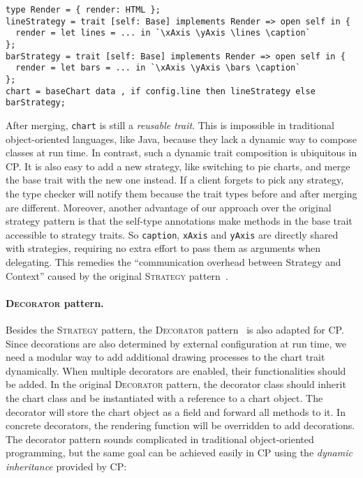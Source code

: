 \begin{lstlisting}
type Render = { render: HTML };
lineStrategy = trait [self: Base] implements Render => open self in {
  render = let lines = ... in `\xAxis \yAxis \lines \caption`
};
barStrategy = trait [self: Base] implements Render => open self in {
  render = let bars = ... in `\xAxis \yAxis \bars \caption`
};
chart = baseChart data , if config.line then lineStrategy else barStrategy;
\end{lstlisting}

\noindent
After merging, \lstinline{chart} is still a \emph{reusable trait}. This is
impossible in traditional object-oriented languages, like Java, because they
lack a dynamic way to compose classes at run time. In contrast, such a dynamic
trait composition is ubiquitous in CP. It is also easy to add a new strategy,
like switching to pie charts, and merge the base trait with the new one instead.
If a client forgets to pick any strategy, the type checker will notify them
because the trait types before and after merging are different. Moreover,
another advantage of our approach over the original strategy pattern is that the
self-type annotations make methods in the base trait accessible to strategy
traits. So \lstinline{caption}, \lstinline{xAxis} and \lstinline{yAxis} are
directly shared with strategies, requiring no extra effort to pass them as
arguments when delegating. This remedies the ``communication overhead between
Strategy and Context'' caused by the original \textsc{Strategy}
pattern~\citep{gamma1995design}.

\paragraph{\textsc{Decorator} pattern.}
Besides the \textsc{Strategy} pattern, the \textsc{Decorator}
pattern~\citep{gamma1995design} is also adapted for CP. Since decorations are
also determined by external configuration at run time, we need a modular way to
add additional drawing processes to the chart trait dynamically. When multiple
decorators are enabled, their functionalities should be added. In the original
\textsc{Decorator} pattern, the decorator class should inherit the chart class
and be instantiated with a reference to a chart object. The decorator will store
the chart object as a field and forward all methods to it. In concrete
decorators, the rendering function will be overridden to add decorations. The
decorator pattern sounds complicated in traditional object-oriented programming,
but the same goal can be achieved easily in CP using the \emph{dynamic
inheritance} provided by CP:

